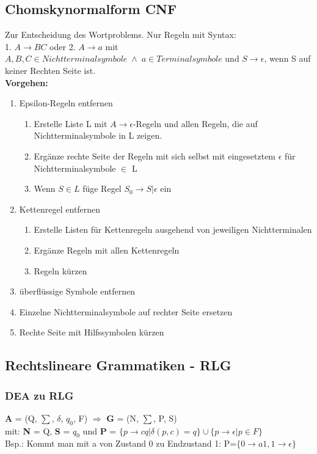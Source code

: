 \documentclass[12pt,a4paper]{article}
\begin{document}
	\subsection{Chomskynormalform CNF}
	Zur Entscheidung des Wortproblems. Nur Regeln mit Syntax: \\
	1. $A \rightarrow BC$ oder 2. $A \rightarrow a$ mit $A,B,C \in Nichtterminalsymbole \; \wedge \; a \in Terminalsymbole$ und $S \rightarrow \epsilon$, wenn S auf keiner Rechten Seite ist.\\
	\textbf{Vorgehen:}
	\begin{enumerate}
		\item Epsilon-Regeln entfernen
		\begin{enumerate}
			\item Erstelle Liste L mit $A\rightarrow \epsilon$-Regeln und allen Regeln, die auf Nichtterminalsymbole in L zeigen.
			\item Ergänze rechte Seite der Regeln mit sich selbst mit eingesetztem $\epsilon$ für Nichtterminalsymbole $\in$ L
			\item Wenn $S \in L$ füge Regel $S_0 \rightarrow S | \epsilon$ ein
		\end{enumerate}
		\item Kettenregel entfernen
		\begin{enumerate}
			\item Erstelle Listen für Kettenregeln ausgehend von jeweiligen Nichtterminalen
			\item Ergänze Regeln mit allen Kettenregeln
			\item Regeln kürzen
		\end{enumerate}
		\item überflüssige Symbole entfernen
		\item Einzelne Nichtterminalsymbole auf rechter Seite ersetzen 
		\item Rechte Seite mit Hilfssymbolen kürzen
	\end{enumerate}

	\subsection{Rechtslineare Grammatiken - RLG}

	\subsubsection{DEA zu RLG}
	\textbf{A} = (Q, $\sum$, $\delta$, $q_0$, F) $\Rightarrow$ \textbf{G} = (N, $\sum$, P, S)\\
	mit: \textbf{N} = Q, \textbf{S} = $q_0$ und \textbf{P} = $\{p \rightarrow cq | \delta (p, c) = q\} \cup \{p \rightarrow \epsilon | p \in F\}$ \\
	Bsp.: Kommt man mit a von Zustand 0 zu Endzustand 1: P=$\{ 0 \rightarrow a1, 1 \rightarrow \epsilon \}$
\end{document}
